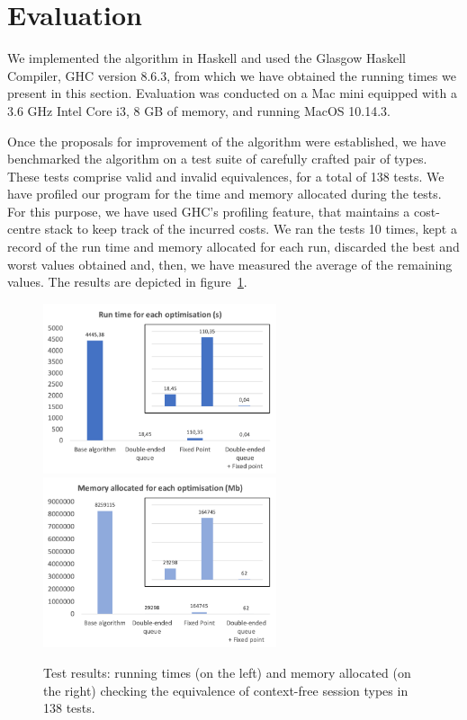\section{Evaluation}
\label{sec:evaluation}





We implemented the algorithm
in Haskell and used the Glasgow Haskell Compiler, GHC version 8.6.3,
from which we have obtained the running times we present in this
section.  Evaluation was conducted on a Mac mini equipped with a 3.6
GHz Intel Core i3, 8 GB of memory, and running MacOS 10.14.3.
%

Once the proposals for improvement of the algorithm were established,
we have benchmarked the algorithm on a test suite of carefully crafted 
pair of types. These tests comprise valid and invalid equivalences, 
for a total of 138 tests. We have profiled our program for the
time and memory allocated during the tests. For this purpose,
we have used GHC's profiling feature, that maintains a cost-centre stack
to keep track of the incurred costs. We ran the tests 10 times, 
kept a record of the run time and memory allocated for each run,
discarded the best and worst values obtained and, then, we have 
measured the average of the remaining values. The results are 
depicted in figure~\ref{fig:results}.

\begin{figure}[h]
	\includegraphics[height=5cm]{img/run_time}	\enspace 
	\includegraphics[height=5cm]{img/memory_alloc}	
	\caption{Test results: running times (on the left) and
	memory allocated (on the right) checking the equivalence 
	of context-free session types in 138 tests.}
	\label{fig:results}
\end{figure}

